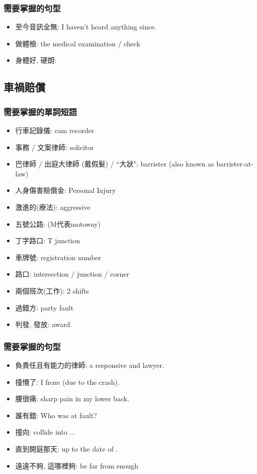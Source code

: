 \subsubsection*{需要掌握的句型}
\begin{itemize}
  \itemsep0em
  \item 至今音訊全無: I haven't heard anything since.
  \item 做體檢:  the medical examination / check
  \item 身體好, 硬朗: 
\end{itemize}

\subsection{車禍賠償}
\subsubsection*{需要掌握的單詞短語}
\begin{multicols}{2}
\begin{itemize}
  \itemsep0em
  \item 行車記錄儀: cam recorder
  \item 事務 / 文案律師: solicitor
  \item 巴律師 / 出庭大律師 (戴假髮) / ``大狀": barrister (also known as barrister-at-law)
  \item 人身傷害賠償金: Personal Injury 
  \item 激進的(療法): aggressive
  \item 五號公路:  (M代表motoway)
  \item 丁字路口: T junction
  \item 車牌號: registration number
  \item 路口: intersection / junction / corner
  \item 兩個班次(工作): 2 shifts
  \item 過錯方: party  fault
  \item 判發, 發放: award
\end{itemize}
\end{multicols}

\subsubsection*{需要掌握的句型}
\begin{itemize}
  \itemsep0em
  \item 負責任且有能力的律師: a responsive and  lawyer.
  \item 撞懵了: I froze (due to the crash).
  \item 腰很痛: sharp pain in my lower back.
  \item 誰有錯: Who was at fault?
  \item 撞向: collide into ...
  \item 直到開庭那天: up to the date of .
  \item 遠遠不夠, 這哪裡夠: be far from enough
\end{itemize}

